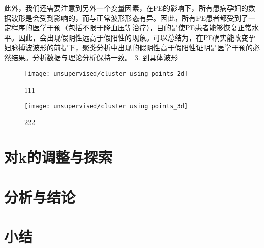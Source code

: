 此外，我们还需要注意到另外一个变量因素，在PE的影响下，所有患病孕妇的数据波形是会受到影响的，而与正常波形形态有异。因此，所有PE患者都受到了一定程序的医学干预（包括不限于降血压等治疗），目的是使PE患者能够恢复正常水平。因此，会出现假阴性远高于假阳性的现象。可以总结为，在PE确实能改变孕妇脉搏波波形的前提下，聚类分析中出现的假阴性高于假阳性证明是医学干预的必然结果。分析数据与理论分析保持一致。
3.	到具体波形

\begin{figure}[htbp]
    \centering
    \texttt{[image: unsupervised/cluster using points\_2d]}
    \caption[]{\label{fig:cluster2d}111}
\end{figure}
\begin{figure}[htbp]
    \centering
    \texttt{[image: unsupervised/cluster using points\_3d]}
    \caption[]{\label{fig:cluster3d}222}
\end{figure}
\section{对k的调整与探索}
\section{分析与结论}
\section{小结}